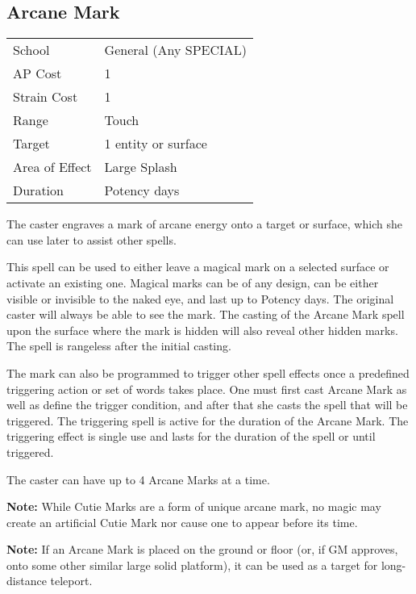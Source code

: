 \documentclass[11pt,a4paper,twocolumn]{book}
\begin{document}

\subsection*{Arcane Mark}
{
	\begin{tabu} to 75mm{| X[l,4] | X[l,7] |}
		\hline
		School 			& General (Any SPECIAL) \\
		AP Cost	      	& 1 					\\
		Strain Cost     & 1 					\\
		Range     		& Touch 				\\
		Target      	& 1 entity or surface 	\\
		Area of Effect  & Large Splash 	 		\\
		Duration     	& Potency days 			\\ \hline
	\end{tabu}
	
}

\medskip

The caster engraves a mark of arcane energy onto a target or surface, which she can use later to assist other spells.

This spell can be used to either leave a magical mark on a selected surface or activate an existing one. Magical marks can be of any design, can be either visible or invisible to the naked eye, and last up to Potency days. The original caster will always be able to see the mark. The casting of the Arcane Mark spell upon the surface where the mark is hidden will also reveal other hidden marks. The spell is rangeless after the initial casting.

The mark can also be programmed to trigger other spell effects once a predefined triggering action or set of words takes place. One must first cast Arcane Mark as well as define the trigger condition, and after that she casts the spell that will be triggered. The triggering spell is active for the duration of the Arcane Mark. The triggering effect is single use and lasts for the duration of the spell or until triggered.

The caster can have up to 4 Arcane Marks at a time.

\textbf{Note:} While Cutie Marks are a form of unique arcane mark, no magic may create an artificial Cutie Mark nor cause one to appear before its time.

\textbf{Note:} If an Arcane Mark is placed on the ground or floor (or, if GM approves, onto some other similar large solid platform), it can be used as a target for long-distance teleport.
\end{document}
